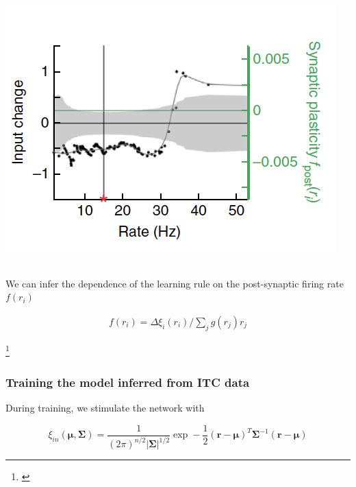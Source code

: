 \documentclass{beamer}
\begin{document}
\begin{frame}[plain]
\begin{columns}[T]
\begin{column}{.7\textwidth}
\begin{center}
\includegraphics[scale=0.65]{learning-rules-g}
\end{center}
\end{column}

\end{columns}

\vspace{0.2in}

We can infer the dependence of the learning rule on the post-synaptic firing rate $f(r_{i})$

\begin{align*}
f(r_{i}) = \Delta \xi_{i}(r_{i})/\sum_{j} g(r_{j})r_{j}
\end{align*}

\footnote{\cite{lim}}

\end{frame}

\begin{frame}[plain]
\frametitle{Training the model inferred from ITC data}

During training, we stimulate the network with

\begin{equation*}
\xi_{in}(\bm{\mu}, \bm{\Sigma}) = \frac{1}{(2\pi)^{n/2}|\bm{\Sigma}|^{1/2}}\exp-\frac{1}{2}(\bm{r}-\bm{\mu})^{T}\bm{\Sigma}^{-1}(\bm{r}-\bm{\mu})
\end{equation*}


\end{frame}
\end{document}

